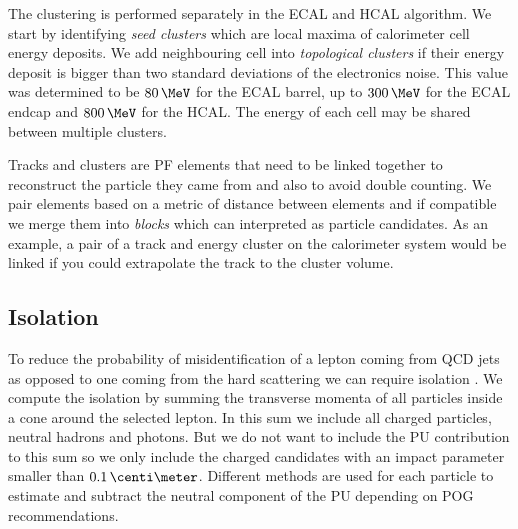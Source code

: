 The clustering is performed separately in the \gls{ECAL} and \gls{HCAL} algorithm. We start by identifying \textit{seed clusters} which are local maxima of calorimeter cell energy deposits. We add neighbouring cell into \textit{topological clusters} if their energy deposit is bigger than two standard deviations of the electronics noise. This value was determined to be $80\,\MeV$ for the \gls{ECAL} barrel, up to $300\,\MeV$ for the \gls{ECAL} endcap and $800\,\MeV$ for the \gls{HCAL}. The energy of each cell may be shared between multiple clusters.

Tracks and clusters are \gls{PF} elements that need to be linked together to reconstruct the particle they came from and also to avoid double counting. We pair elements based on a metric of distance between elements and if compatible we merge them into \textit{blocks} which can interpreted as particle candidates. As an example, a pair of a track and energy cluster on the calorimeter system would be linked if you could extrapolate the track to the cluster volume.


\subsection{Isolation}
\label{SUBSECTION:EventReconstructionAndSimulation_ParticleFlow_LeptonIsolation}


To reduce the probability of misidentification of a lepton coming from \gls{QCD} jets as opposed to one coming from the hard scattering we can require isolation \cite{ARTICLE:CMSElectronReconstruction8TeV, ARTICLE:CMSMuonReconstruction7TeV}. We compute the isolation by summing the transverse momenta of all particles inside a cone around the selected lepton. In this sum we include all charged particles, neutral hadrons and photons. But we do not want to include the \gls{PU} contribution to this sum so we only include the charged candidates with an impact parameter smaller than $0.1 \,\centi\meter$. Different methods are used for each particle to estimate and subtract the neutral component of the \gls{PU} depending on \gls{POG} recommendations.

